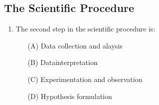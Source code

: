 \subsection{The Scientific Procedure}

\begin{enumerate}
	\item The second step in the scientific procedure is:
	\begin{enumerate}[topsep=0ex,itemsep=0ex,partopsep=1ex,parsep=1ex]
		\item[(A)] Data collection and alaysis
		\item[(B)] Datainterpretation
		\item[(C)] Experimentation and observation
		\item[(D)] Hypothesis formulation
	\end{enumerate}
\end{enumerate}